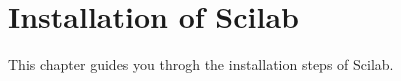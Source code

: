 \chapter [Installation of Scilab]{Installation of Scilab}

This chapter guides you throgh the installation steps of Scilab.

